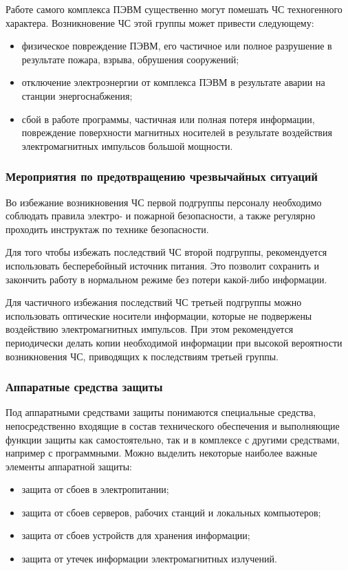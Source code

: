 Работе самого комплекса ПЭВМ существенно могут помешать ЧС техногенного характера.
Возникновение ЧС этой группы может привести следующему:
\begin{itemize}
  \item физическое повреждение ПЭВМ, его частичное или полное разрушение в результате пожара, взрыва, обрушения сооружений;
  \item отключение электроэнергии от комплекса ПЭВМ в результате аварии на станции энергоснабжения;
  \item сбой в работе программы, частичная или полная потеря информации, повреждение поверхности магнитных носителей в результате воздействия электромагнитных импульсов большой мощности.
\end{itemize}

\subsubsection{Мероприятия по предотвращению чрезвычайных ситуаций}
Во избежание возникновения ЧС первой подгруппы персоналу необходимо соблюдать правила электро- и пожарной безопасности, а также регулярно проходить инструктаж по технике безопасности.

Для того чтобы избежать последствий ЧС второй подгруппы, рекомендуется использовать бесперебойный источник питания. Это позволит сохранить и закончить работу в нормальном режиме без потери какой-либо информации.

Для частичного избежания последствий ЧС третьей подгруппы можно использовать оптические носители информации, которые не подвержены воздействию электромагнитных импульсов.
При этом рекомендуется периодически делать копии необходимой информации при высокой вероятности возникновения ЧС, приводящих к последствиям третьей группы.

\subsubsection{Аппаратные средства защиты}

Под аппаратными средствами защиты понимаются специальные средства, непосредственно входящие в состав технического обеспечения и выполняющие функции защиты как самостоятельно, так и в комплексе с другими средствами, например с программными.
Можно выделить некоторые наиболее важные элементы аппаратной защиты:
\begin{itemize}
  \item защита от сбоев в электропитании;
  \item защита от сбоев серверов, рабочих станций и локальных компьютеров;
  \item защита от сбоев устройств для хранения информации;
  \item защита от утечек информации электромагнитных излучений.
\end{itemize}

